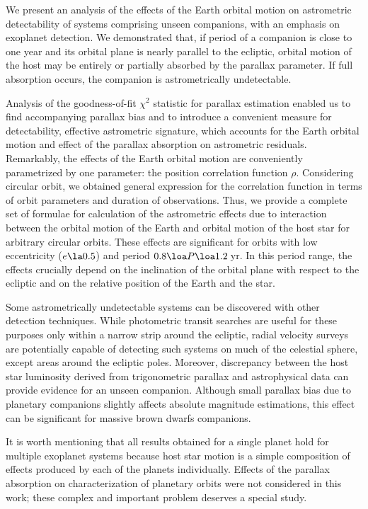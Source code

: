\documentclass[fleqn,usenatbib,useAMS,usedcolumn]{mnras}
\begin{document}
We present an analysis of the effects of the Earth orbital motion on astrometric detectability of systems comprising unseen companions, with an emphasis on exoplanet detection. We demonstrated that, if period of a companion is close to one year and its orbital plane is nearly parallel to the ecliptic, orbital motion of the host may be entirely or partially absorbed by the parallax parameter. If full absorption occurs, the companion is astrometrically undetectable.

Analysis of the goodness-of-fit $\chi^2$ statistic for parallax estimation enabled us to find accompanying parallax bias and to introduce a convenient measure for detectability, effective astrometric signature, which accounts for the Earth orbital motion and effect of the parallax absorption on astrometric residuals. Remarkably, the effects of the Earth orbital motion are conveniently parametrized by one parameter: the position correlation function $\rho$. Considering circular orbit, we obtained general expression for the correlation function in terms of orbit parameters and duration of observations. Thus, we provide a complete set of formulae for calculation of the astrometric effects due to interaction between the orbital motion of the Earth and orbital motion of the host star for arbitrary circular orbits. These effects are significant for orbits with low eccentricity ($e\la0.5$) and period $0.8\loa P\loa 1.2$\,yr. In this period range, the effects crucially depend on the inclination of the orbital plane with respect to the ecliptic and on the relative position of the Earth and the star.

Some astrometrically undetectable systems can be discovered with other detection techniques. While photometric transit searches are useful for these purposes only within a narrow strip around the ecliptic, radial velocity surveys are potentially capable of detecting such systems on much of the celestial sphere, except areas around the ecliptic poles. Moreover, discrepancy between the host star luminosity derived from trigonometric parallax and astrophysical data can provide evidence for an unseen companion. Although small parallax bias due to planetary companions slightly affects absolute magnitude estimations, this effect can be significant for massive brown dwarfs companions.

It is worth mentioning that all results obtained for a single planet hold for multiple exoplanet systems because host star motion is a simple composition of effects produced by each of the planets individually. Effects of the parallax absorption on characterization of planetary orbits were not considered in this work; these complex and important problem deserves a special study.
\end{document}

